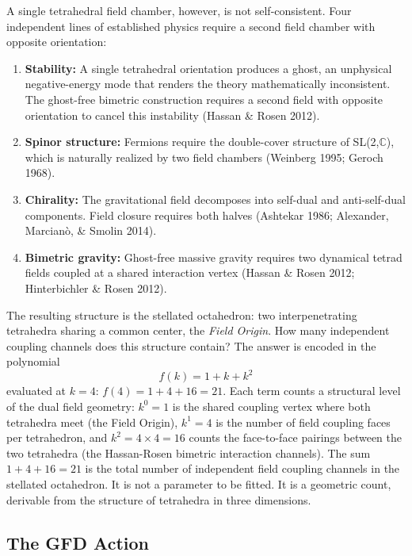 \documentclass[aps,prd,preprint,superscriptaddress,showpacs,preprintnumbers,amsmath,amssymb,nofootinbib]{revtex4-2}
\begin{document}
A single tetrahedral field chamber, however, is not self-consistent. Four independent lines of established physics require a second field chamber with opposite orientation:
\begin{enumerate}
\item \textbf{Stability:} A single tetrahedral orientation produces a ghost, an unphysical negative-energy mode that renders the theory mathematically inconsistent. The ghost-free bimetric construction requires a second field with opposite orientation to cancel this instability (Hassan \& Rosen 2012).
\item \textbf{Spinor structure:} Fermions require the double-cover structure of SL(2,$\mathbb{C}$), which is naturally realized by two field chambers (Weinberg 1995; Geroch 1968).
\item \textbf{Chirality:} The gravitational field decomposes into self-dual and anti-self-dual components. Field closure requires both halves (Ashtekar 1986; Alexander, Marcian\`{o}, \& Smolin 2014).
\item \textbf{Bimetric gravity:} Ghost-free massive gravity requires two dynamical tetrad fields coupled at a shared interaction vertex (Hassan \& Rosen 2012; Hinterbichler \& Rosen 2012).
\end{enumerate}

The resulting structure is the stellated octahedron: two interpenetrating tetrahedra sharing a common center, the \emph{Field Origin}. How many independent coupling channels does this structure contain? The answer is encoded in the polynomial
\begin{equation}
f(k) = 1 + k + k^2
\label{eq:polynomial}
\end{equation}
evaluated at $k = 4$: $f(4) = 1 + 4 + 16 = 21$. Each term counts a structural level of the dual field geometry: $k^0 = 1$ is the shared coupling vertex where both tetrahedra meet (the Field Origin), $k^1 = 4$ is the number of field coupling faces per tetrahedron, and $k^2 = 4 \times 4 = 16$ counts the face-to-face pairings between the two tetrahedra (the Hassan-Rosen bimetric interaction channels). The sum $1 + 4 + 16 = 21$ is the total number of independent field coupling channels in the stellated octahedron. It is not a parameter to be fitted. It is a geometric count, derivable from the structure of tetrahedra in three dimensions.

\subsection{The GFD Action}
\label{subsec:covariant}
\end{document}
